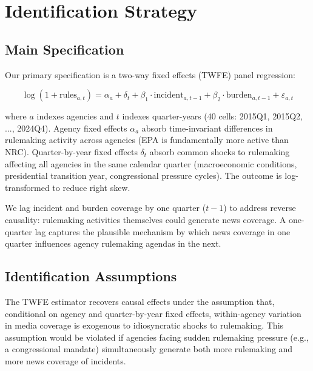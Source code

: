 \documentclass[12pt]{article}
\begin{document}
\section{Identification Strategy}
\label{sec:design}

\subsection{Main Specification}

Our primary specification is a two-way fixed effects (TWFE) panel regression:

\begin{equation}
\log(1 + \text{rules}_{a,t}) = \alpha_a + \delta_t + \beta_1 \cdot \text{incident}_{a,t-1} + \beta_2 \cdot \text{burden}_{a,t-1} + \varepsilon_{a,t}
\label{eq:main}
\end{equation}

where $a$ indexes agencies and $t$ indexes quarter-years (40 cells: 2015Q1, 2015Q2, ..., 2024Q4). Agency fixed effects $\alpha_a$ absorb time-invariant differences in rulemaking activity across agencies (EPA is fundamentally more active than NRC). Quarter-by-year fixed effects $\delta_t$ absorb common shocks to rulemaking affecting all agencies in the same calendar quarter (macroeconomic conditions, presidential transition year, congressional pressure cycles). The outcome is log-transformed to reduce right skew.

We lag incident and burden coverage by one quarter ($t-1$) to address reverse causality: rulemaking activities themselves could generate news coverage. A one-quarter lag captures the plausible mechanism by which news coverage in one quarter influences agency rulemaking agendas in the next.

\subsection{Identification Assumptions}

The TWFE estimator recovers causal effects under the assumption that, conditional on agency and quarter-by-year fixed effects, within-agency variation in media coverage is exogenous to idiosyncratic shocks to rulemaking. This assumption would be violated if agencies facing sudden rulemaking pressure (e.g., a congressional mandate) simultaneously generate both more rulemaking and more news coverage of incidents.
\end{document}
